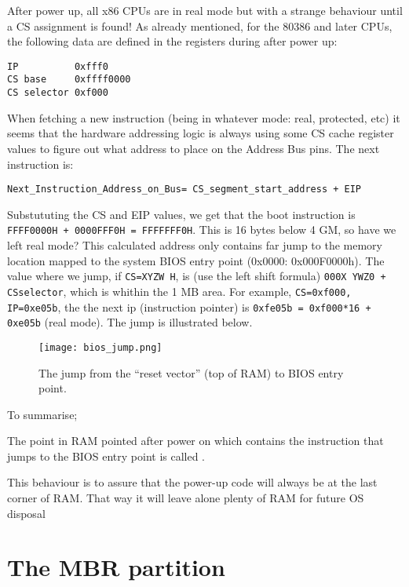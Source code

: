 \documentclass[a4paper]{article}
\begin{document}
After power up, all x86 CPUs are in real mode but with a strange behaviour until a CS assignment is found! As already mentioned, for the 80386 and later CPUs, the following data are defined in the registers during after power up:
\begin{verbatim}
IP          0xfff0
CS base     0xffff0000
CS selector 0xf000
\end{verbatim}
When fetching a new instruction (being in whatever mode: real, protected, etc) it seems that the hardware addressing logic is always using some CS cache register values to figure out what address to place on the Address Bus pins. The next instruction is:
\begin{verbatim}
Next_Instruction_Address_on_Bus= CS_segment_start_address + EIP
\end{verbatim}
Substututing the CS and EIP values, we get that the boot instruction is \texttt{FFFF0000H + 0000FFF0H = FFFFFFF0H}. This is 16 bytes below 4 GM, so have we left real mode? This calculated address only contains  far jump to the memory location mapped to the system BIOS entry point (0x0000: 0x000F0000h).
The value where we jump, if \texttt{CS=XYZW H}, is (use the left shift formula) \texttt{000X YWZ0 + CSselector}, which is whithin the 1 MB area. For example, \texttt{CS=0xf000, IP=0xe05b}, the the next ip (instruction pointer) is   \texttt{0xfe05b = 0xf000*16 + 0xe05b} (real mode). The jump is illustrated below.

\begin{figure}[H]
	\centering
	\texttt{[image: bios\_jump.png]}
	\caption{The jump from the ``reset vector'' (top of RAM) to BIOS entry point.}
\end{figure}
To summarise;
\begin{definition}
	The point in RAM pointed after power on which contains the instruction that jumps to the BIOS entry point is called . 
\end{definition}

This behaviour is to assure that the power-up code will always be at the last corner of RAM. That way it will leave alone plenty of RAM for future OS disposal


\newpage
\section{The MBR partition}
\end{document}
